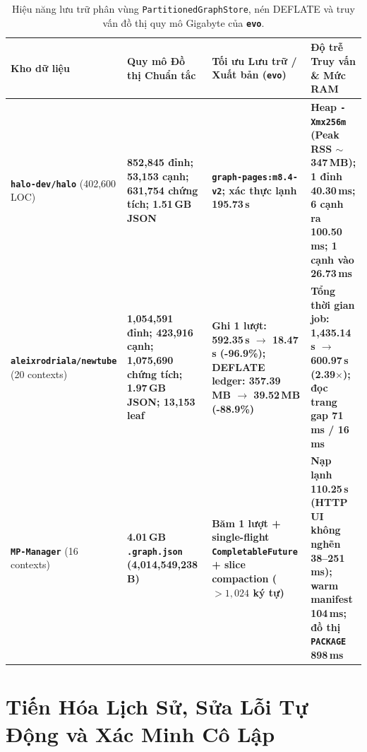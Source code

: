 \documentclass[10pt,a4paper]{article}
\begin{document}
\begin{table}[htbp]
\centering
\caption{Hiệu năng lưu trữ phân vùng \texttt{PartitionedGraphStore}, nén DEFLATE và truy vấn đồ thị quy mô Gigabyte của \textbf{\texttt{evo}}.}
\label{tab:storage}
\scriptsize
\renewcommand{\arraystretch}{1.22}
\begin{tabularx}{\textwidth}{>{\raggedright\arraybackslash}p{2.6cm} >{\raggedright\arraybackslash}p{3.4cm} >{\raggedright\arraybackslash}X >{\raggedright\arraybackslash}X}
\toprule
\textbf{Kho dữ liệu} & \textbf{Quy mô Đồ thị Chuẩn tắc} & \textbf{Tối ưu Lưu trữ / Xuất bản (\textbf{\texttt{evo}})} & \textbf{Độ trễ Truy vấn \& Mức RAM} \\
\midrule
\textbf{\texttt{halo-dev/halo}} (402,600 LOC) \cite{m84step6} & \textbf{852,845 đỉnh; 53,153 cạnh; 631,754 chứng tích; 1.51\,GB JSON} & \textbf{\texttt{graph-pages:m8.4-v2}; xác thực lạnh 195.73\,s} & \textbf{Heap \texttt{-Xmx256m} (Peak RSS $\sim$347\,MB); 1 đỉnh 40.30\,ms; 6 cạnh ra 100.50\,ms; 1 cạnh vào 26.73\,ms} \\
\textbf{\texttt{aleixrodriala/newtube}} (20 contexts) \cite{newtube2026} & \textbf{1,054,591 đỉnh; 423,916 cạnh; 1,075,690 chứng tích; 1.97\,GB JSON; 13,153 leaf} & \textbf{Ghi 1 lượt: 592.35\,s $\rightarrow$ 18.47\,s (-96.9\%); DEFLATE ledger: 357.39\,MB $\rightarrow$ 39.52\,MB (-88.9\%)} & \textbf{Tổng thời gian job: 1,435.14\,s $\rightarrow$ 600.97\,s (2.39$\times$); đọc trang gap 71\,ms / 16\,ms} \\
\textbf{\texttt{MP-Manager}} (16 contexts) \cite{currentstate2026} & \textbf{4.01\,GB \texttt{.graph.json} (4,014,549,238\,B)} & \textbf{Băm 1 lượt + single-flight \texttt{CompletableFuture} + slice compaction ($>1,024$ ký tự)} & \textbf{Nạp lạnh 110.25\,s (HTTP UI không nghẽn 38--251\,ms); warm manifest 104\,ms; đồ thị \texttt{PACKAGE} 898\,ms} \\
\bottomrule
\end{tabularx}
\end{table}

\section{Tiến Hóa Lịch Sử, Sửa Lỗi Tự Động và Xác Minh Cô Lập}
\end{document}
